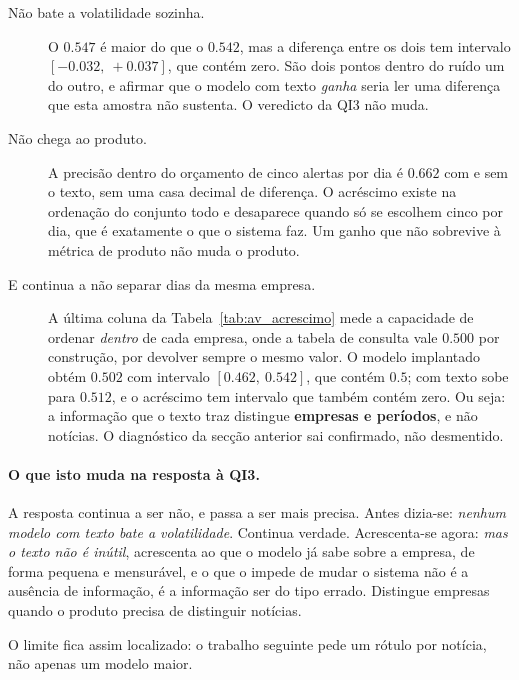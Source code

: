 \begin{description}
  \item[Não bate a volatilidade sozinha.] O $0.547$ é maior do que o $0.542$, mas a diferença
        entre os dois tem intervalo $[-0.032,\ +0.037]$, que contém zero. São dois pontos dentro
        do ruído um do outro, e afirmar que o modelo com texto \emph{ganha} seria ler uma
        diferença que esta amostra não sustenta. O veredicto da \gls{QI}3 não muda.

  \item[Não chega ao produto.] A precisão dentro do orçamento de cinco alertas por dia é
        $0.662$ com e sem o texto, sem uma casa decimal de diferença. O acréscimo existe na
        ordenação do conjunto todo e desaparece quando só se escolhem cinco por dia, que é
        exatamente o que o sistema faz. Um ganho que não sobrevive à métrica de produto não muda
        o produto.

  \item[E continua a não separar dias da mesma empresa.] A última coluna da
        Tabela~\ref{tab:av_acrescimo} mede a capacidade de ordenar \emph{dentro} de cada empresa,
        onde a tabela de consulta vale $0.500$ por construção, por devolver sempre o mesmo valor.
        O modelo implantado obtém $0.502$ com intervalo $[0.462,\ 0.542]$, que contém $0.5$; com
        texto sobe para $0.512$, e o acréscimo tem intervalo que também contém zero. Ou seja: a
        informação que o texto traz distingue \textbf{empresas e períodos}, e não notícias. O
        diagnóstico da secção anterior sai confirmado, não desmentido.
\end{description}

\paragraph{O que isto muda na resposta à \gls{QI}3.} A resposta continua a ser não, e passa a ser
mais precisa. Antes dizia-se: \emph{nenhum modelo com texto bate a volatilidade}. Continua
verdade. Acrescenta-se agora: \emph{mas o texto não é inútil}, acrescenta ao que o modelo já sabe
sobre a empresa, de forma pequena e mensurável, e o que o impede de mudar o sistema não é a
ausência de informação, é a informação ser do tipo errado. Distingue empresas quando o produto precisa de
distinguir notícias.

O limite fica assim localizado: o trabalho seguinte pede um rótulo por notícia, não apenas um
modelo maior.

